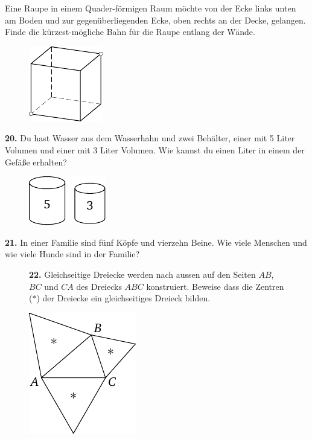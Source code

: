 \documentclass[12pt]{article} %
\begin{document}
 Eine Raupe in einem Quader-förmigen Raum möchte von der Ecke links unten am Boden und zur gegenüberliegenden Ecke, oben rechts an der Decke, gelangen. 
Finde die kürzest-mögliche Bahn für die Raupe entlang der Wände. 
\begin{figure}[h]
\centering
\footnotesize
\includegraphics[scale=1]{taskbook-3}
\end{figure}
\newline\newline\quad
{\bf 20.} Du hast Wasser aus dem Wasserhahn und zwei Behälter, einer mit 5 Liter Volumen und einer mit 3 Liter Volumen. Wie kannst du einen Liter in einem der Gefäße erhalten?
\begin{figure}[h!]
\centering
\footnotesize
\includegraphics[scale=1]{taskbook-4}
\end{figure}

\medskip\noindent
{\bf 21.} In einer Familie sind fünf Köpfe und vierzehn Beine. Wie viele Menschen und wie viele Hunde sind in der Familie?
\begin{figure}[h!]
\begin{minipage}[c][][c]{0.7 \textwidth}
{\bf 22.} Gleichseitige Dreiecke werden nach aussen auf den Seiten $AB$, $BC$ und $CA$ des Dreiecks $ABC$ konstruiert. Beweise dass die Zentren ($*$) der Dreiecke ein gleichseitiges Dreieck bilden.\end{minipage}
\hfill
\begin{minipage}[c]{0.2 \textwidth}
\includegraphics[scale=1]{taskbook-6}
\end{minipage}
\end{figure}
\end{document}
